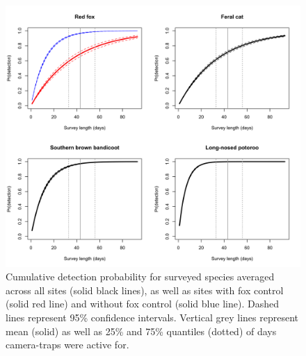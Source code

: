 \documentclass[11pt,a4paper,titlepage,twoside,openright]{style/unimelbthesis}
\begin{document}
\begin{mainmatter}
\newpage

\(~\)

\(~\)

\(~\)
\begin{figure}

{\centering \includegraphics[width=1\linewidth]{figure/detectability} 

}

\caption{Cumulative detection probability for surveyed species averaged across all sites (solid black lines), as well as sites with fox control (solid red line) and without fox control (solid blue line). Dashed lines represent 95\% confidence intervals. Vertical grey lines represent mean (solid) as well as 25\% and 75\% quantiles (dotted) of days camera-traps were active for.}\label{fig:occ-cumdet}
\end{figure}
\newpage

\(~\)

\(~\)

\(~\)
\begin{figure}


\end{figure}
\end{mainmatter}
\end{document}
